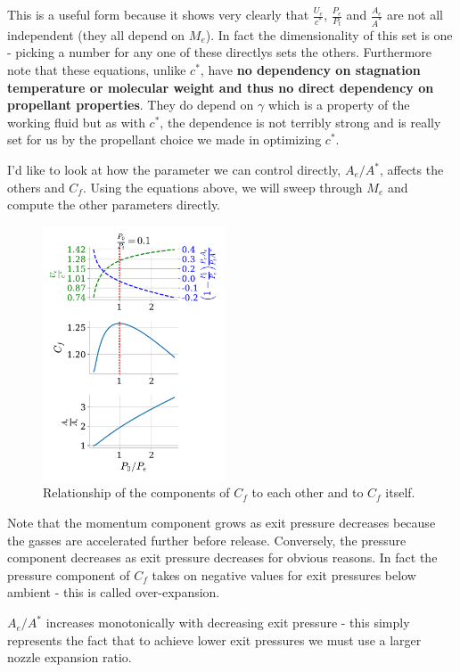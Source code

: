 \documentclass[twocolumn]{memoir} %
\begin{document}
This is a useful form because it shows very clearly that
\(\frac{U_e}{c^*}\), \(\frac{P_e}{P_t}\) and \(\frac{A_e}{A^*}\) are not
all independent (they all depend on \(M_e\)). In fact the dimensionality
of this set is one - picking a number for any one of these directlys
sets the others. Furthermore note that these equations, unlike \(c^*\),
have \textbf{no dependency on stagnation temperature or molecular weight and
thus no direct dependency on propellant properties}. They do depend on
\(\gamma\) which is a property of the working fluid but as with \(c^*\),
the dependence is not terribly strong and is really set for us by the
propellant choice we made in optimizing \(c^*\).

I'd like to look at how the parameter we can control directly,
\(A_e/A^*\), affects the others and \(C_f\). Using the equations
above, we will sweep through \(M_e\) and compute the other parameters
directly.

\begin{figure}[H]
    \includegraphics[width=0.48\textwidth]{imgs/Cf_5_7.pdf}
    \caption{Relationship of the components of $C_f$ to each other and to $C_f$ itself.}
\end{figure}

Note that the momentum component grows as exit pressure decreases because the gasses are accelerated further before release.  Conversely, the pressure component decreases as exit pressure decreases for obvious reasons.  In fact the pressure component of $C_f$ takes on negative values for exit pressures below ambient - this is called over-expansion.

$A_e/A^*$ increases monotonically with decreasing exit pressure - this simply represents the fact that to achieve lower exit pressures we must use a larger nozzle expansion ratio.
\end{document}
